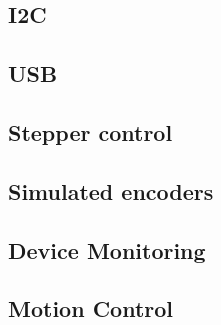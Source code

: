 \subsection{I2C}
\subsection{USB}
\subsection{Stepper control} %
\subsection{Simulated encoders}
\subsection{Device Monitoring}
\subsection{Motion Control} %
